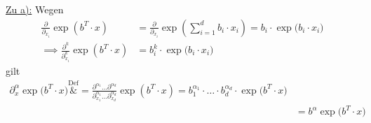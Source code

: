 \begin{lösung}
	\underline{Zu a):}
	Wegen
	\begin{align*}
		\frac{\partial}{\partial_{x_i}}\exp(b^T\cdot x)
		&=\frac{\partial}{\partial_{x_i}}\exp\left(\sum\limits_{i=1}^d b_i\cdot x_i\right)
		=b_i\cdot\exp\big(b_i\cdot x_i\big)\\
		\implies\frac{\partial^k}{\partial_{x_i}^k}\exp(b^T\cdot x)
		&=b_i^k\cdot\exp\big(b_i\cdot x_i\big)
	\end{align*}
	gilt
	\begin{align*}
		\partial_x^\alpha\exp\big(b^T\cdot x\big)
		\overset{\text{Def}}&{=}
		\frac{\partial^{\alpha_1}\ldots\partial^{\alpha_d}}{\partial_{x_1}^{\alpha_1}\ldots\partial_{x_d}^{\alpha_d}}\exp(b^T\cdot x)
		=b_1^{\alpha_1}\cdot\ldots\cdot b_d^{\alpha_d}\cdot\exp\big(b^T\cdot x\big)\\
		&=b^\alpha \exp\big(b^T\cdot x\big)
	\end{align*}
	

\end{lösung}
